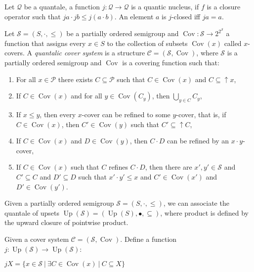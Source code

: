 \documentclass[a4paper]{article}
\theoremstyle{defin}
\theoremstyle{theorem}
\theoremstyle{claim}
\theoremstyle{prop}
\theoremstyle{lemma}
\theoremstyle{fact}
\theoremstyle{ex}
\theoremstyle{col}
\begin{document}
Let $\mathcal{Q}$ be a quantale, a function $j : \mathcal{Q} \to \mathcal{Q}$ is a quantic nucleus, if $f$ is a closure operator such that $j a \cdot j b \leq j (a \cdot b)$. An element $a$ is $j$-closed iff $j a = a$.

Let $\mathcal{S} = (S, \cdot, \leq)$ be a partially ordered semigroup and $\operatorname{Cov} : \mathcal{S} \to 2^{2^{\mathcal{S}}}$ a function that assigns every $x \in S$ to the collection of subsets $\operatorname{Cov}(x)$ called $x$-covers. A \emph{quantalic cover system} is a structure $\mathcal{C} = (\mathcal{S}, \operatorname{Cov})$, where $\mathcal{S}$ is a partially ordered semigroup and $\operatorname{Cov}$ is a covering function such that:
\begin{enumerate}
\item For all $x \in \mathcal{P}$ there exists $C \subseteq \mathcal{P}$ such that $C \in \operatorname{Cov}(x)$ and $C \subseteq \uparrow x$,
\item If $C \in \operatorname{Cov}(x)$ and for all $y \in \operatorname{Cov}(C_y)$, then $\bigcup \limits_{y \in C} C_y$,
\item If $x \leq y$, then every $x$-cover can be refined to some $y$-cover, that is, if $C \in \operatorname{Cov}(x)$, then $C' \in \operatorname{Cov}(y)$ such that $C' \subseteq \uparrow C$,
\item If $C \in \operatorname{Cov}(x)$ and $D \in \operatorname{Cov}(y)$, then $C \cdot D$ can be refined by an $x \cdot y$-cover,
\item If $C \in \operatorname{Cov}(x)$ such that $C$ refines $C \cdot D$, then there are $x', y' \in \mathcal{S}$ and $C' \subseteq C$ and $D' \subseteq D$ such that $x' \cdot y' \leq x$ and $C' \in \operatorname{Cov}(x')$ and $D' \in \operatorname{Cov}(y')$.
\end{enumerate}

Given a partially ordered semigroup $\mathcal{S} = (S, \cdot, \leq)$, we can associate the quantale of upsets $\operatorname{Up}(\mathcal{S}) = (\operatorname{Up}(S), \bullet, \subseteq)$, where product is defined by the upward closure of pointwise product.

Given a cover system $\mathcal{C} = (\mathcal{S}, \operatorname{Cov})$. Define a function $j : \operatorname{Up}(\mathcal{S}) \to \operatorname{Up}(\mathcal{S})$:
\begin{center}
$j X = \{ x \in \mathcal{S} \: | \: \exists C \in \operatorname{Cov}(x) \: | \: C \subseteq X \}$
\end{center}
\end{document}
